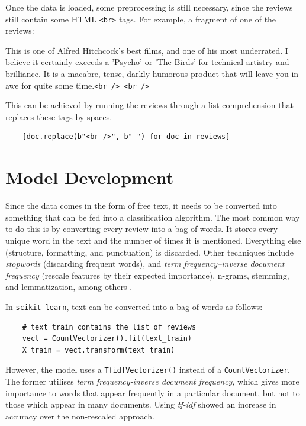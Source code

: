 \documentclass[a4paper,12pt]{article}
\begin{document}
Once the data is loaded, some preprocessing is still necessary, since the reviews still contain some HTML \texttt{<br>} tags. For example, a fragment of one of 
the reviews:

\begin{displayquote}
 This is one of Alfred Hitchcock's best films, and one of his most underrated. I believe it certainly exceeds a 'Psycho' or 'The Birds' for technical artistry and brilliance. It is a macabre, tense, darkly humorous product that will leave you in awe for quite some time.\texttt{<br /> <br />}
\end{displayquote}

This can be achieved by running the reviews through a list comprehension that replaces these tags by spaces.

\begin{verbatim}
    [doc.replace(b"<br />", b" ") for doc in reviews]
\end{verbatim}

\section{Model Development}

Since the data comes in the form of free text, it needs to be converted into
something that can be fed into a classification algorithm.
The most common way to do this is by converting every review into a bag-of-words.
It stores every unique word in the text and the number of times it is mentioned.
Everything else (structure, formatting, and punctuation) is discarded.
Other techniques include \textit{stopwords} (discarding frequent words),
and \textit{term frequency–inverse document frequency}
(rescale features by their expected importance), n-grams,
stemming, and lemmatization, among others \parencite[327,344]{Mueller2017}.

In \texttt{scikit-learn}, text can be converted into a bag-of-words as follows:

\begin{verbatim}
    # text_train contains the list of reviews
    vect = CountVectorizer().fit(text_train)
    X_train = vect.transform(text_train)
\end{verbatim}

However, the model uses a \texttt{TfidfVectorizer()} instead of a 
\texttt{CountVectorizer}.
The former utilises \textit{term frequency-inverse document frequency}, which
gives more importance to words that appear frequently in a particular document,
but not to those which appear in many documents.
Using \textit{tf-idf} showed an increase in accuracy over the non-rescaled
approach.
\end{document}
